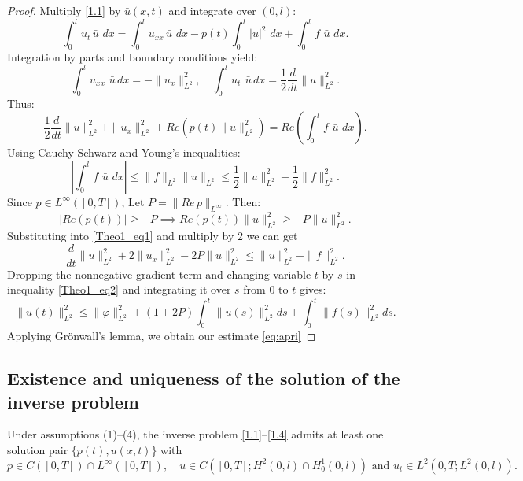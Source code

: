 \documentclass[reqno]{amsart}
\begin{document}
\begin{proof}
Multiply \eqref{1.1} by $\bar{u}(x,t)$ and integrate over $(0,l)$:
\[
\int_0^l u_t \, \bar{u} \,\, dx = \int_0^l u_{xx} \,\bar{u} \,\, dx - p(t) \int_0^l |u|^2 \,\, dx + \int_0^l f \,\,\bar{u} \,\, dx.
\]
Integration by parts and boundary conditions yield:
\[
\int_0^l u_{xx} \,\,\bar{u} \, dx = - \| u_x\|_{L^2}^2, \quad \int_0^l u_t \,\ \bar{u} \, dx = \frac{1}{2} \frac{d}{dt} \| u\|_{L^2}^2.
\]
Thus:
\begin{equation} \label{Theo1_eq1}
\frac{1}{2} \frac{d}{dt} \| u \|_{L^2}^2 + \| u_x \|_{L^2}^2 + Re\left(p(t) \| u \|_{L^2}^2 \right) = Re\left(\int_0^l f \,\, \bar{u} \,\, dx\right).
\end{equation}
Using Cauchy-Schwarz and Young's inequalities:
\[
\left| \int_0^l f \,\, \bar{u}  \,\, dx \right| \leq \| f \|_{L^2} \| u \|_{L^2} \leq \frac{1}{2}\| u \|_{L^2}^2 + \frac{1}{2} \| f \|_{L^2}^2.
\]
Since $p \in L^{\infty}([0,T])$, Let $P = \|Re\,p\|_{L^{\infty}}$. Then:
\[
|Re\left(p(t)\right)| \geq -P \implies  Re\left(p(t)\right)\|u\|^2_{L^2} \geq -P\|u\|^2_{L^2}.
\]
Substituting into \eqref{Theo1_eq1} and multiply by 2 we can get
\begin{equation} \label{Theo1_eq2}
 \frac{d}{dt} \| u \|_{L^2}^2 + 2\| u_x \|_{L^2}^2 - 2P\|u\|^2_{L^2} \leq  \| u \|_{L^2}^2 + \| f \|_{L^2}^2.
\end{equation}
Dropping the nonnegative gradient term and changing variable \( t\) by \( s\)  in inequality \eqref{Theo1_eq2} and integrating it over \( s\) from \( 0\) to \(t\) gives: 
\[
  \| u(t) \|_{L^2}^2 \leq \|\varphi\|_{L^2}^2 + (1+2P)\int_0^t \| u(s) \|_{L^2}^2 ds + \int_0^t \| f(s) \|_{L^2}^2 ds.
\]
Applying Grönwall's lemma, we obtain our estimate \eqref{eq:apri}
\end{proof}



\subsection{Existence and uniqueness of the solution of the inverse problem}
\begin{theorem}\label{thm:inverse}
Under assumptions (1)--(4), the inverse problem \eqref{1.1}--\eqref{1.4} admits at least one solution pair $\{p(t), u(x,t)\}$ with
\[
p \in C([0,T]) \cap L^{\infty}([0,T]), \quad u \in C([0,T];H^2(0,l) \cap H_0^1(0,l)) \text{ and } u_t \in L^2(0,T;L^2(0,l)).
\]
\end{theorem}
\end{document}
